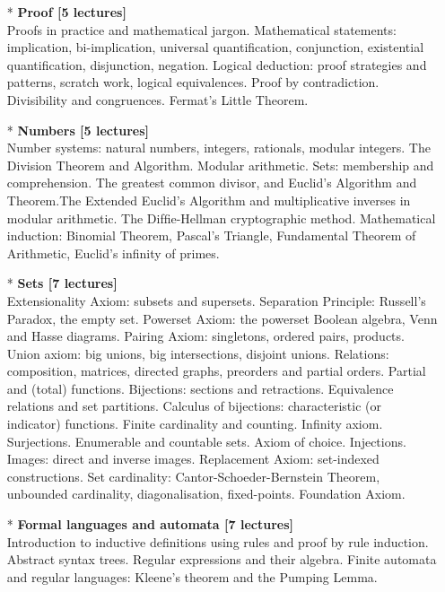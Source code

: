 \documentclass[a4paper]{article}
\begin{document}
\maketitle

\begin{itemize}
\item[*]\textbf{Proof [5 lectures]}\\
Proofs in practice and mathematical jargon. Mathematical statements: implication, bi-implication, universal quantiﬁcation, conjunction, existential quantiﬁcation, disjunction, negation. Logical deduction: proof strategies and patterns, scratch work, logical equivalences. Proof by contradiction. Divisibility and congruences. Fermat’s Little Theorem. 

\item[*]\textbf{Numbers [5 lectures]}\\
Number systems: natural numbers, integers, rationals, modular integers. The Division Theorem and Algorithm. Modular arithmetic. Sets: membership and comprehension. The greatest common divisor, and Euclid’s Algorithm and Theorem.The Extended Euclid’s Algorithm and multiplicative inverses in modular arithmetic. The Difﬁe-Hellman cryptographic method. Mathematical induction: Binomial Theorem, Pascal’s Triangle, Fundamental Theorem of Arithmetic, Euclid’s inﬁnity of primes. 

\item[*]\textbf{Sets [7 lectures]}\\
Extensionality Axiom: subsets and supersets. Separation Principle: Russell’s Paradox, the empty set. Powerset Axiom: the powerset Boolean algebra, Venn and Hasse diagrams. Pairing Axiom: singletons, ordered pairs, products. Union axiom: big unions, big intersections, disjoint unions. Relations: composition, matrices, directed graphs, preorders and partial orders. Partial and (total) functions. Bijections: sections and retractions. Equivalence relations and set partitions. Calculus of bijections: characteristic (or indicator) functions. Finite cardinality and counting. Inﬁnity axiom. Surjections. Enumerable and countable sets. Axiom of choice. Injections. Images: direct and inverse images. Replacement Axiom: set-indexed constructions. Set cardinality: Cantor-Schoeder-Bernstein Theorem, unbounded cardinality, diagonalisation, ﬁxed-points. Foundation Axiom. 

\item[*]\textbf{Formal languages and automata [7 lectures]}\\
Introduction to inductive deﬁnitions using rules and proof by rule induction. Abstract syntax trees. Regular expressions and their algebra. Finite automata and regular languages: Kleene’s theorem and the Pumping Lemma.


\end{itemize}
\end{document}
